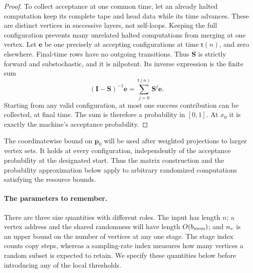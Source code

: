 \documentclass[11pt]{article}
\numberwithin{equation}{section}
\theoremstyle{definition}
\theoremstyle{remark}
\begin{document}
\begin{proof}
To collect acceptance at one common time, let an already halted computation keep its complete tape and head data while its time advances. These are distinct vertices in successive layers, not self-loops. Keeping the full configuration prevents many unrelated halted computations from merging at one vertex. Let ${\mathbf{e}}$ be one precisely at accepting
configurations at time ${\mathsf{t}}(n)$, and zero elsewhere. Final-time rows
have no outgoing transitions. Thus ${\mathbf{S}}$ is strictly forward and
substochastic, and it is nilpotent. Its inverse expression is the finite
sum
\[
({\mathbf{I}}-{\mathbf{S}})^{-1}{\mathbf{e}}=\sum_{j=0}^{{\mathsf{t}}(n)}{\mathbf{S}}^j{\mathbf{e}}.
\]
Starting from any valid configuration, at most one success contribution can be
collected, at final time. The sum is therefore a probability in
$[0,1]$. At $x_0$ it is exactly the machine's acceptance probability.
\end{proof}

The coordinatewise bound on ${\mathbf{p}}_0$ will be used after weighted projections
to larger vertex sets.  It holds at every configuration, independently
of the acceptance probability at the designated start.  Thus the matrix
construction and the probability approximation below apply to arbitrary
randomized computations satisfying the resource bounds.

\paragraph{The parameters to remember.}
There are three size quantities with different roles. The input has length $n$; a vertex address and the shared randomness will have length $O({b_{\rm mem}})$; and ${n_{\rm v}}$ is an upper bound on the number of vertices at any one stage. The stage index counts copy steps, whereas a sampling-rate index measures how many vertices a random subset is expected to retain. We specify these quantities below before introducing any of the local thresholds.
\end{document}
